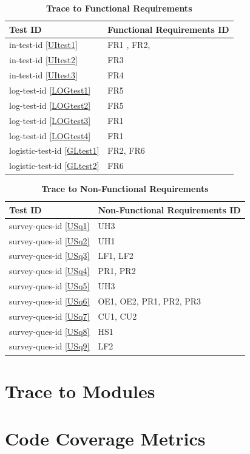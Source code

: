 \documentclass[12pt, titlepage]{article}
\newcommand{\UIref}[1]{in-test-id \ref{#1}}
\newcommand{\LOGref}[1]{log-test-id \ref{#1}}
\newcommand{\GLref}[1]{logistic-test-id \ref{#1}}
\newcommand{\USref}[1]{survey-ques-id \ref{#1}}
\begin{document}
\begin{table}[H]
\caption{\textbf{Trace to Functional Requirements}} \label{TbFRTrace}
\begin{tabularx}{\textwidth}{p{3cm}X}
\toprule
\textbf{Test ID} & \textbf{Functional Requirements ID} \\
\midrule

\UIref{UItest1} & FR1 , FR2,  \\
\UIref{UItest2} & FR3 \\
\UIref{UItest3} & FR4 \\
\LOGref{LOGtest1} & FR5\\
\LOGref{LOGtest2} & FR5\\
\LOGref{LOGtest3} & FR1\\
\LOGref{LOGtest4}  & FR1\\
\GLref{GLtest1} & FR2, FR6\\
\GLref{GLtest2} & FR6\\

\bottomrule
\end{tabularx}
\end{table}

\begin{table}[H]
\caption{\textbf{Trace to Non-Functional Requirements}} \label{TbNFRTrace}
\begin{tabularx}{\textwidth}{p{3.1cm}X}
\toprule
\textbf{Test ID} & \textbf{Non-Functional Requirements ID} \\
\midrule

\USref{USq1} & UH3 \\
\USref{USq2} & UH1 \\
\USref{USq3} & LF1, LF2 \\
\USref{USq4} & PR1, PR2 \\
\USref{USq5} & UH3\\
\USref{USq6} & OE1, OE2, PR1, PR2, PR3\\
\USref{USq7} & CU1, CU2\\
\USref{USq8} & HS1\\
\USref{USq9} & LF2 \\

\bottomrule
\end{tabularx}
\end{table}
		
\section{Trace to Modules}		

\section{Code Coverage Metrics}




\end{document}
